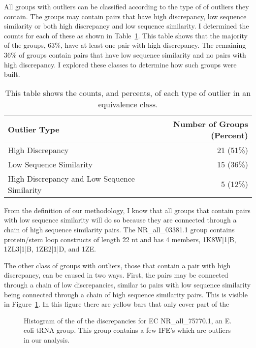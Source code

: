 All groups with outliers can be classified according to the type of of outliers
they contain. The groups may contain pairs that have high discrepancy, low
sequence similarity or both high discrepancy and low sequence similarity. I
determined the counts for each of these as shown in
Table~\ref{tab:outlier-types}. This table shows that the majority of the groups,
63\%, have at least one pair with high discrepancy. The remaining 36\% of groups
contain pairs that have low sequence similarity and no pairs with high
discrepancy. I explored these classes to determine how such groups were built.

\begin{table}
  \begin{tabular}{lr}
    \toprule
    Outlier Type & Number of Groups (Percent) \\
    \midrule
    High Discrepancy & 21 (51\%) \\
    Low Sequence Similarity & 15 (36\%) \\
    High Discrepancy and Low Sequence Similarity & 5 (12\%) \\
    \bottomrule
  \end{tabular}
  \caption{This table shows the counts, and percents, of each type of outlier
  in an equivalence class.}
  \label{tab:outlier-types}
\end{table}

From the definition of our methodology, I know that all groups that contain
pairs with low sequence similarity will do so because they are connected through
a chain of high sequence similarity pairs. The NR\_all\_03381.1 group contains
protein/stem loop constructs of length 22 nt and has 4 members, 1K8W|1|B,
1ZL3|1|B, 1ZE2|1|D, and 1ZE. 

The other class of groups with outliers, those that contain a pair with high
discrepancy, can be caused in two ways. First, the pairs may be connected
through a chain of low discrepancies, similar to pairs with low sequence
similarity being connected through a chain of high sequence similarity pairs.
This is visible in Figure~\ref{fig:nr-all-75770.1-disc}. In this figure there are
yellow bars that only cover part of the 

\begin{figure}
  \caption{Histogram of the of the discrepancies for EC NR\_all\_75770.1, an E.
    coli tRNA group. This group contains a few IFE's which are outliers in our
  analysis.}
  \label{fig:nr-all-75770.1-disc}
\end{figure}

